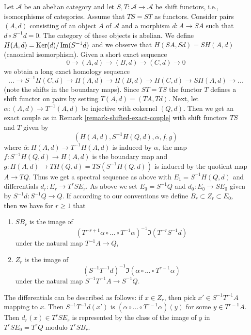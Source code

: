 \begin{remark}[Variant]
\label{remark-differential-object-selfmap}
Let $\mathcal{A}$ be an abelian category and let
$S, T : \mathcal{A} \to \mathcal{A}$ be shift functors, i.e.,
isomorphisms of categories. Assume that $TS = ST$ as functors.
Consider pairs $(A, d)$ consisting of an object $A$ of $\mathcal{A}$
and a morphism $d : A \to SA$ such that $d \circ S^{-1}d = 0$.
The category of these objects is abelian.
We define $H(A, d) = \mathop{\mathrm{Ker}}(d)/\mathop{\mathrm{Im}}(S^{-1}d)$ and we observe that
$H(SA, Sd) = SH(A, d)$ (canonical isomorphism).
Given a short exact sequence
$$
0 \to (A, d) \to (B, d) \to (C, d) \to 0
$$
we obtain a long exact homology sequence
$$
\ldots \to S^{-1}H(C, d) \to
H(A, d) \to H(B, d) \to H(C, d) \to SH(A, d) \to \ldots
$$
(note the shifts in the boundary maps). Since $ST = TS$ the functor
$T$ defines a shift functor on pairs by setting $T(A, d) = (TA, Td)$.
Next, let $\alpha : (A, d) \to T^{-1}(A, d)$ be injective with
cokernel $(Q, d)$. Then we get an exact couple as in
Remark \ref{remark-shifted-exact-couple} with shift functors $TS$ and
$T$ given by
$$
(H(A, d), S^{-1}H(Q, d), \overline{\alpha}, f, g)
$$
where $\overline{\alpha} : H(A, d) \to T^{-1}H(A, d)$ is induced by $\alpha$,
the map $f : S^{-1}H(Q, d) \to H(A, d)$ is the boundary
map and $g : H(A, d) \to TH(Q, d) = TS(S^{-1}H(Q, d))$ is induced by
the quotient map $A \to TQ$. Thus we get a spectral sequence as above
with $E_1 = S^{-1}H(Q, d)$ and differentials $d_r : E_r \to T^rSE_r$.
As above we set $E_0 = S^{-1}Q$ and $d_0 : E_0 \to SE_0$ given by
$S^{-1}d : S^{-1}Q \to Q$. If according to our conventions we define
$B_r \subset Z_r \subset E_0$, then we have for $r \geq 1$ that
\begin{enumerate}
\item $SB_r$ is the image of
$$
(T^{-r + 1}\alpha \circ \ldots \circ T^{-1}\alpha)^{-1}
\Im(T^{-r}S^{-1}d)
$$
under the natural map $T^{-1}A \to Q$,
\item $Z_r$ is the image of
$$
(S^{-1}T^{-1}d)^{-1}
\Im(\alpha \circ \ldots \circ T^{r - 1}\alpha)
$$
under the natural map $S^{-1}T^{-1}A \to S^{-1}Q$.
\end{enumerate}
The differentials can be described as follows: if $x \in Z_r$, then
pick $x' \in S^{-1}T^{-1}A$ mapping to $x$. Then $S^{-1}T^{-1}d(x')$
is $(\alpha \circ \ldots \circ T^{r - 1}\alpha)(y)$ for some
$y \in T^{r - 1}A$. Then $d_r(x) \in T^rSE_r$ is represented by the
class of the image of $y$ in $T^rSE_0 = T^rQ$ modulo $T^rSB_r$.
\end{remark}













